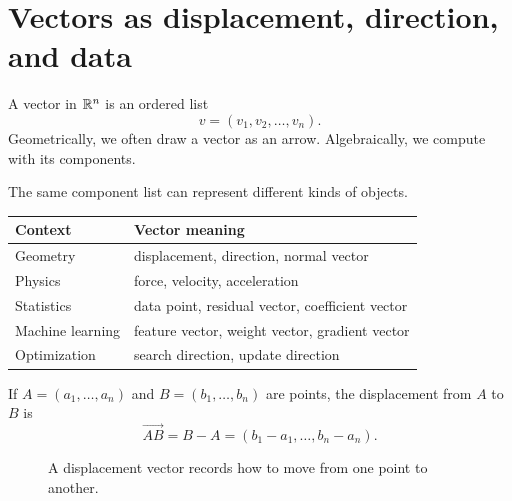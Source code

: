 \section{Vectors as displacement, direction, and data}

\begin{definitionbox}
A vector in $\mathbb{R}^n$ is an ordered list
\[
  v=(v_1,v_2,\ldots,v_n).
\]
Geometrically, we often draw a vector as an arrow. Algebraically, we compute with its components.
\end{definitionbox}

The same component list can represent different kinds of objects.

\begin{center}
\begin{tabularx}{0.92\textwidth}{@{}lX@{}}
\toprule
\textbf{Context} & \textbf{Vector meaning} \\
\midrule
Geometry & displacement, direction, normal vector \\
Physics & force, velocity, acceleration \\
Statistics & data point, residual vector, coefficient vector \\
Machine learning & feature vector, weight vector, gradient vector \\
Optimization & search direction, update direction \\
\bottomrule
\end{tabularx}
\end{center}

If $A=(a_1,\ldots,a_n)$ and $B=(b_1,\ldots,b_n)$ are points, the displacement from $A$ to $B$ is
\[
  \overrightarrow{AB}=B-A=(b_1-a_1,\ldots,b_n-a_n).
\]

\begin{figure}[H]
\centering
{}
\caption{A displacement vector records how to move from one point to another.}
\end{figure}

